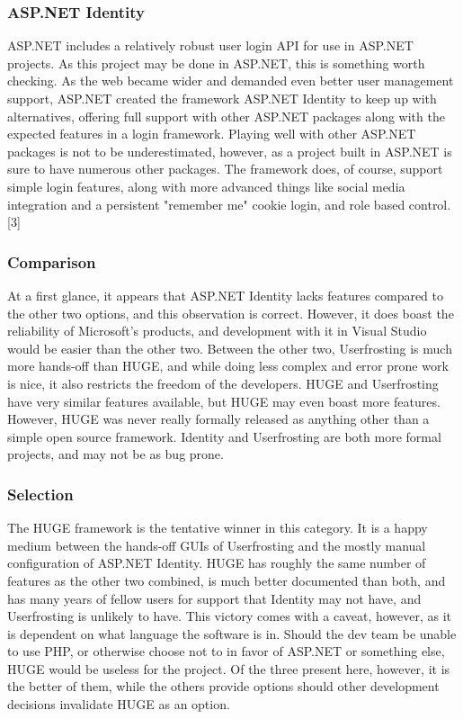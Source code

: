 \documentclass[onecolumn, draftclsnofoot,10pt, compsoc]{IEEEtran}
\begin{document}
\subsubsection{ASP.NET Identity}
ASP.NET includes a relatively robust user login API for use in ASP.NET projects. As this project may be done in ASP.NET, this is something worth checking. As the web
became wider and demanded even better user management support, ASP.NET created the framework ASP.NET Identity to keep up with alternatives, offering full support with
other ASP.NET packages along with the expected features in a login framework. Playing well with other ASP.NET packages is not to be underestimated, however, as a project 
built in ASP.NET is sure to have numerous other packages. The framework does, of course, support simple login features, along with more advanced things like social media 
integration and a persistent "remember me" cookie login, and role based control.[3]
\subsubsection{Comparison}
At a first glance, it appears that ASP.NET Identity lacks features compared to the other two options, and this observation is correct. However, it does boast the reliability of
Microsoft's products, and development with it in Visual Studio would be easier than the other two. Between the other two, Userfrosting is much more hands-off than HUGE, and 
while doing less complex and error prone work is nice, it also restricts the freedom of the developers. HUGE and Userfrosting have very similar features available, but HUGE may 
even boast more features. However, HUGE was never really formally released as anything other than a simple open source framework. Identity and Userfrosting are both more formal 
projects, and may not be as bug prone.
\subsubsection{Selection}
The HUGE framework is the tentative winner in this category. It is a happy medium between the hands-off GUIs of Userfrosting and the mostly manual configuration of ASP.NET Identity.
HUGE has roughly the same number of features as the other two combined, is much better documented than both, and has many years of fellow users for support that Identity may
not have, and Userfrosting is unlikely to have. This victory comes with a caveat, however, as it is dependent on what language the software is in. Should the dev team be unable to
use PHP, or otherwise choose not to in favor of ASP.NET or something else, HUGE would be useless for the project. Of the three present here, however, it is the better of them, 
while the others provide options should other development decisions invalidate HUGE as an option.
\end{document}
